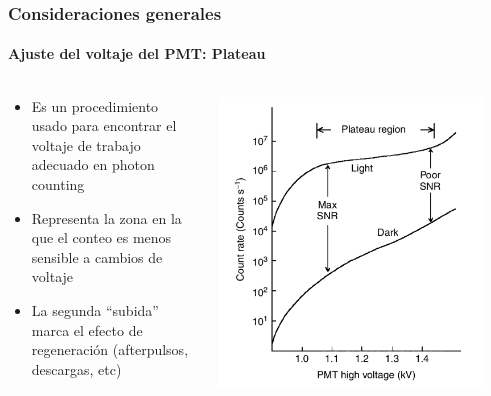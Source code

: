 \documentclass{beamer}
\begin{document}
\begin{frame}
\frametitle{Consideraciones generales}
\framesubtitle{Ajuste del voltaje del PMT: Plateau}
\begin{columns}
\begin{column}{0.5\textwidth}
\begin{itemize}
\item Es un procedimiento usado para encontrar el voltaje de trabajo adecuado en
photon counting 
\item Representa la zona en la que el conteo es menos sensible a cambios de
voltaje 
\item La segunda ``subida'' marca el efecto de regeneración (afterpulsos,
descargas, etc)
\end{itemize}
\end{column}
\begin{column}{0.5\textwidth}
\begin{center}
\includegraphics[width=0.9\textwidth]{d1/plateau2}
\end{center}
\end{column}
\end{columns}
\end{frame}
\end{document}
